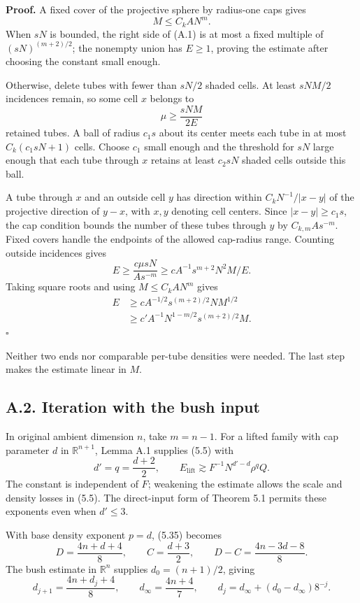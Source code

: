 \documentclass[
  11pt,
  a4paper,
]{article}
\begin{document}
\textbf{Proof.} A fixed cover of the projective sphere by radius-one
caps gives \[
M\le C_k A N^m.
\] When \(sN\) is bounded, the right side of (A.1) is at most a fixed
multiple of \((sN)^{(m+2)/2}\); the nonempty union has \(E\ge1\),
proving the estimate after choosing the constant small enough.

Otherwise, delete tubes with fewer than \(sN/2\) shaded cells. At least
\(sNM/2\) incidences remain, so some cell \(x\) belongs to \[
\mu\ge \frac{sNM}{2E}
\] retained tubes. A ball of radius \(c_1s\) about its center meets each
tube in at most \(C_k(c_1sN+1)\) cells. Choose \(c_1\) small enough and
the threshold for \(sN\) large enough that each tube through \(x\)
retains at least \(c_2sN\) shaded cells outside this ball.

A tube through \(x\) and an outside cell \(y\) has direction within
\(C_kN^{-1}/|x-y|\) of the projective direction of \(y-x\), with \(x,y\)
denoting cell centers. Since \(|x-y|\ge c_1s\), the cap condition bounds
the number of these tubes through \(y\) by \(C_{k,m}A s^{-m}\). Fixed
covers handle the endpoints of the allowed cap-radius range. Counting
outside incidences gives \[
E\ge \frac{c\mu sN}{A s^{-m}}
\ge c A^{-1}s^{m+2}N^2M/E.
\] Taking square roots and using \(M\le C_kAN^m\) gives \[
\begin{aligned}
E&\ge cA^{-1/2}s^{(m+2)/2}N M^{1/2}\\
 &\ge c'A^{-1}N^{1-m/2}s^{(m+2)/2}M.
\end{aligned}
\] \(\square\)

Neither two ends nor comparable per-tube densities were needed. The last
step makes the estimate linear in \(M\).

\hypertarget{a.2.-iteration-with-the-bush-input}{%
\subsection{A.2. Iteration with the bush
input}\label{a.2.-iteration-with-the-bush-input}}

In original ambient dimension \(n\), take \(m=n-1\). For a lifted family
with cap parameter \(d\) in \(\mathbb R^{n+1}\), Lemma A.1 supplies
(5.5) with \[
d'=q=\frac{d+2}{2},\qquad
E_{\mathrm{lift}}\gtrsim F^{-1}N^{d'-d}\rho^qQ.
\] The constant is independent of \(F\); weakening the estimate allows
the scale and density losses in (5.5). The direct-input form of Theorem
5.1 permits these exponents even when \(d'\le3\).

With base density exponent \(p=d\), (5.35) becomes \[
D=\frac{4n+d+4}{8},\qquad
C=\frac{d+3}{2},\qquad
D-C=\frac{4n-3d-8}{8}.
\tag{A.2}\label{eq:A.2}
\] The bush estimate in \(\mathbb R^n\) supplies \(d_0=(n+1)/2\), giving
\[
d_{j+1}=\frac{4n+d_j+4}{8},\qquad
d_\infty=\frac{4n+4}{7},\qquad
d_j=d_\infty+(d_0-d_\infty)8^{-j}.
\tag{A.3}\label{eq:A.3}
\]
\end{document}
